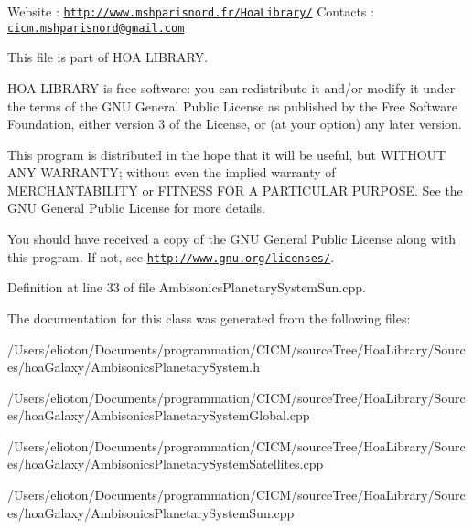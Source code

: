 Website \-: \href{http://www.mshparisnord.fr/HoaLibrary/}{\tt http\-://www.\-mshparisnord.\-fr/\-Hoa\-Library/} Contacts \-: \href{mailto:cicm.mshparisnord@gmail.com}{\tt cicm.\-mshparisnord@gmail.\-com}

This file is part of H\-O\-A L\-I\-B\-R\-A\-R\-Y.

H\-O\-A L\-I\-B\-R\-A\-R\-Y is free software\-: you can redistribute it and/or modify it under the terms of the G\-N\-U General Public License as published by the Free Software Foundation, either version 3 of the License, or (at your option) any later version.

This program is distributed in the hope that it will be useful, but W\-I\-T\-H\-O\-U\-T A\-N\-Y W\-A\-R\-R\-A\-N\-T\-Y; without even the implied warranty of M\-E\-R\-C\-H\-A\-N\-T\-A\-B\-I\-L\-I\-T\-Y or F\-I\-T\-N\-E\-S\-S F\-O\-R A P\-A\-R\-T\-I\-C\-U\-L\-A\-R P\-U\-R\-P\-O\-S\-E. See the G\-N\-U General Public License for more details.

You should have received a copy of the G\-N\-U General Public License along with this program. If not, see \href{http://www.gnu.org/licenses/}{\tt http\-://www.\-gnu.\-org/licenses/}. 

Definition at line 33 of file Ambisonics\-Planetary\-System\-Sun.\-cpp.



The documentation for this class was generated from the following files\-:\begin{DoxyCompactItemize}
\item 
/\-Users/elioton/\-Documents/programmation/\-C\-I\-C\-M/source\-Tree/\-Hoa\-Library/\-Sources/hoa\-Galaxy/Ambisonics\-Planetary\-System.\-h\item 
/\-Users/elioton/\-Documents/programmation/\-C\-I\-C\-M/source\-Tree/\-Hoa\-Library/\-Sources/hoa\-Galaxy/Ambisonics\-Planetary\-System\-Global.\-cpp\item 
/\-Users/elioton/\-Documents/programmation/\-C\-I\-C\-M/source\-Tree/\-Hoa\-Library/\-Sources/hoa\-Galaxy/Ambisonics\-Planetary\-System\-Satellites.\-cpp\item 
/\-Users/elioton/\-Documents/programmation/\-C\-I\-C\-M/source\-Tree/\-Hoa\-Library/\-Sources/hoa\-Galaxy/Ambisonics\-Planetary\-System\-Sun.\-cpp\end{DoxyCompactItemize}
